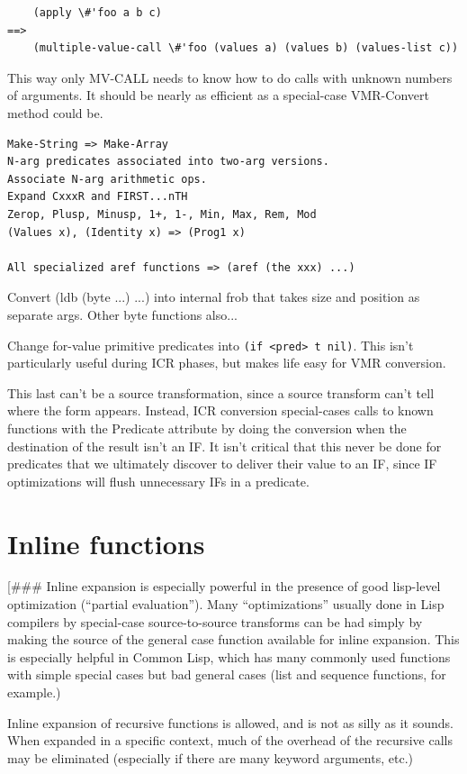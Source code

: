 \begin{verbatim}
    (apply \#'foo a b c)
==>
    (multiple-value-call \#'foo (values a) (values b) (values-list c))
\end{verbatim}

This way only MV-CALL needs to know how to do calls with unknown numbers of
arguments.  It should be nearly as efficient as a special-case VMR-Convert
method could be.


\begin{verbatim}
Make-String => Make-Array
N-arg predicates associated into two-arg versions.
Associate N-arg arithmetic ops.
Expand CxxxR and FIRST...nTH
Zerop, Plusp, Minusp, 1+, 1-, Min, Max, Rem, Mod
(Values x), (Identity x) => (Prog1 x)

All specialized aref functions => (aref (the xxx) ...)
\end{verbatim}

Convert (ldb (byte ...) ...) into internal frob that takes size and position as
separate args.  Other byte functions also...

Change for-value primitive predicates into \verb+(if <pred> t nil)+.  This isn't
particularly useful during ICR phases, but makes life easy for VMR conversion.


This last can't be a source transformation, since a source transform can't tell
where the form appears.  Instead, ICR conversion special-cases calls to known
functions with the Predicate attribute by doing the conversion when the
destination of the result isn't an IF.  It isn't critical that this never be
done for predicates that we ultimately discover to deliver their value to an
IF, since IF optimizations will flush unnecessary IFs in a predicate.

\section{Inline functions}

[\#\#\# Inline expansion is especially powerful in the presence of good lisp-level
optimization (``partial evaluation'').  Many ``optimizations'' usually done in Lisp
compilers by special-case source-to-source transforms can be had simply by
making the source of the general case function available for inline expansion.
This is especially helpful in Common Lisp, which has many commonly used
functions with simple special cases but bad general cases (list and sequence
functions, for example.)

Inline expansion of recursive functions is allowed, and is not as silly as it
sounds.  When expanded in a specific context, much of the overhead of the
recursive calls may be eliminated (especially if there are many keyword
arguments, etc.)

